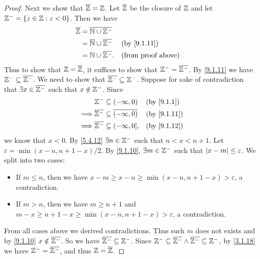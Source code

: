 \begin{proof}
  Next we show that \(\overline{\mathbb{Z}} = \mathbb{Z}\).
  Let \(\overline{\mathbb{Z}}\) be the closure of \(\mathbb{Z}\) and let \(\mathbb{Z}^- = \left\lbrace z \in \mathbb{Z} : z < 0\right\rbrace\).
  Then we have
  \begin{align*}
    \overline{\Z} & = \overline{\N \cup \Z^-}                                           \\
                  & = \overline{\N} \cup \overline{\Z^-} &  & \by{9.1.11}               \\
                  & = \N \cup \overline{\Z^-}.           &  & \text{(from proof above)}
  \end{align*}
  Thus to show that \(\mathbb{Z} = \overline{\mathbb{Z}}\), it suffices to show that \(\mathbb{Z}^- = \overline{\mathbb{Z}^-}\).
  By \cref{9.1.11} we have \(\mathbb{Z}^- \subseteq \overline{\mathbb{Z}^-}\).
  We need to show that \(\overline{\mathbb{Z}^-} \subseteq \mathbb{Z}^-\).
  Suppose for sake of contradiction that \(\exists x \in \overline{\mathbb{Z}^-}\) such that \(x \notin \mathbb{Z}^-\).
  Since
  \begin{align*}
             & \Z^- \subseteq (-\infty, 0)                       &  & \by{9.1.1}  \\
    \implies & \overline{\Z^-} \subseteq \overline{(-\infty, 0)} &  & \by{9.1.11} \\
    \implies & \overline{\Z^-} \subseteq (-\infty, 0],           &  & \by{9.1.12}
  \end{align*}
  we know that \(x < 0\).
  By \cref{5.4.12} \(\exists n \in \mathbb{Z}^-\) such that \(n < x < n + 1\).
  Let \(\varepsilon = \min(x - n, n + 1 - x) / 2\).
  By \cref{9.1.10}, \(\exists m \in \mathbb{Z}^-\) such that \(\left\lvert x - m\right\rvert \leq \varepsilon\).
  We split into two cases:
  \begin{itemize}
    \item If \(m \leq n\), then we have \(x - m \geq x - n \geq \min(x - n, n + 1 - x) > \varepsilon\), a contradiction.
    \item If \(m > n\), then we have \(m \geq n + 1\) and \(m - x \geq n + 1 - x \geq \min(x - n, n + 1 - x) > \varepsilon\), a contradiction.
  \end{itemize}
  From all cases above we derived contradictions.
  Thus such \(m\) does not exists and by \cref{9.1.10} \(x \notin \overline{\mathbb{Z}^-}\).
  So we have \(\overline{\mathbb{Z}^-} \subseteq \mathbb{Z}^-\).
  Since \(\mathbb{Z}^- \subseteq \overline{\mathbb{Z}^-} \land \overline{\mathbb{Z}^-} \subseteq \mathbb{Z}^-\), by \cref{3.1.18} we have \(\mathbb{Z}^- = \overline{\mathbb{Z}^-}\), and thus \(\mathbb{Z} = \overline{\mathbb{Z}}\).


\end{proof}
